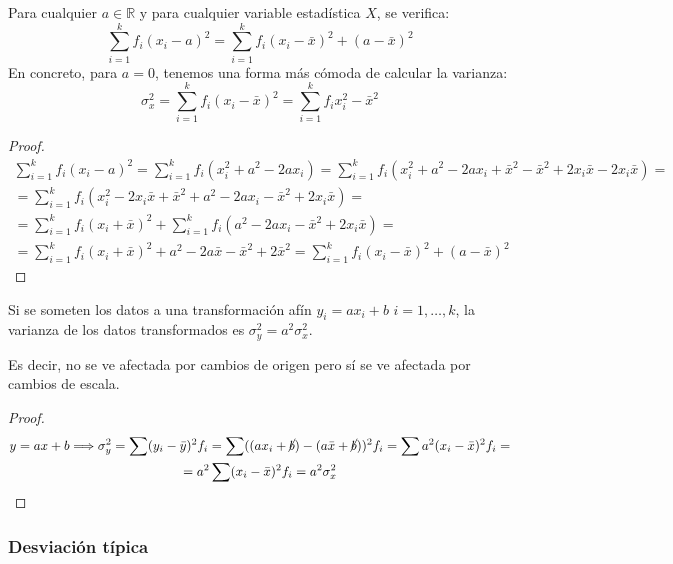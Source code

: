 \begin{teo} Para cualquier $a\in \mathbb{R}$ y para cualquier variable estadística $X$, se verifica:
\begin{equation*}
    \sum_{i=1}^k f_i (x_i-a)^2 = \sum_{i=1}^k f_i (x_i-\bar{x})^2 +(a-\bar{x})^2
\end{equation*}
En concreto, para $a=0$, tenemos una forma más cómoda de calcular la varianza:
\begin{equation*}
    \sigma_x^2 = \sum_{i=1}^k f_i (x_i-\bar{x})^2 = \sum_{i=1}^k f_i x_i^2 -\bar{x}^2
\end{equation*}
\end{teo}
\begin{proof}
     \begin{multline*}
         \sum_{i=1}^k f_i (x_i-a)^2
         = \sum_{i=1}^k f_i (x_i^2 + a^2 - 2ax_i)
         = \sum_{i=1}^k f_i (x_i^2 + a^2 - 2ax_i +\bar{x}^2 - \bar{x}^2 + 2x_i\bar{x} - 2x_i\bar{x})
         =\\=
         \sum_{i=1}^k f_i (x_i^2 - 2x_i\bar{x} + \bar{x}^2 + a^2 - 2ax_i  - \bar{x}^2 + 2x_i\bar{x})
         =\\=
         \sum_{i=1}^k f_i (x_i + \bar{x})^2 +\sum_{i=1}^k f_i( a^2 - 2ax_i  - \bar{x}^2 + 2x_i\bar{x})
         =\\=
         \sum_{i=1}^k f_i (x_i + \bar{x})^2 +a^2 -2a\bar{x} -\bar{x}^2 +2\bar{x}^2
         = \sum_{i=1}^k f_i (x_i-\bar{x})^2 +(a-\bar{x})^2
     \end{multline*}
\end{proof}

\begin{prop}
    Si se someten los datos a una transformación afín $y_i=ax_i+b$ $i = 1, \dots ,k$, la varianza de los datos transformados es $\sigma^2_y = a^2\sigma^2_x$.

    Es decir, no se ve afectada por cambios de origen pero sí se ve afectada por cambios de escala.
\end{prop}
\begin{proof}
    \begin{multline*}
        y=ax+b \Longrightarrow \sigma_y^2 = \sum (y_i-\bar{y})^2f_i = \sum ((ax_i+\cancel{b})-(a\bar{x}+\cancel{b}))^2 f_i = \sum a^2(x_i-\bar{x})^2f_i =\\
        =a^2 \sum (x_i-\bar{x})^2f_i = a^2 \sigma^2_x
    \end{multline*}
\end{proof}

\subsubsection{Desviación típica}


